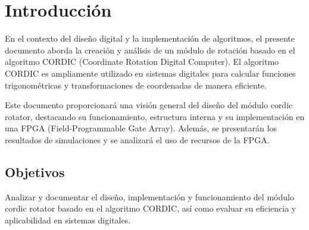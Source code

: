 \documentclass[12pt,a4paper, twoside]{article} %
\begin{document}
\maketitle
\tableofcontents

\newpage

\section{Introducción}
\label{sec:org60390fa}

En el contexto del diseño digital y la implementación de algoritmos, el presente documento aborda la creación y análisis de un módulo de rotación basado en el algoritmo CORDIC (Coordinate Rotation Digital Computer). El algoritmo CORDIC es ampliamente utilizado en sistemas digitales para calcular funciones trigonométricas y transformaciones de coordenadas de manera eficiente.

Este documento proporcionará una visión general del diseño del módulo cordic rotator, destacando su funcionamiento, estructura interna y su implementación en una FPGA (Field-Programmable Gate Array). Además, se presentarán los resultados de simulaciones y se analizará el uso de recursos de la FPGA.


\subsection{Objetivos}
\label{subsec:org12e44a2}

Analizar y documentar el diseño, implementación y funcionamiento del módulo cordic rotator basado en el algoritmo CORDIC, así como evaluar su eficiencia y aplicabilidad en sistemas digitales.
\end{document}
